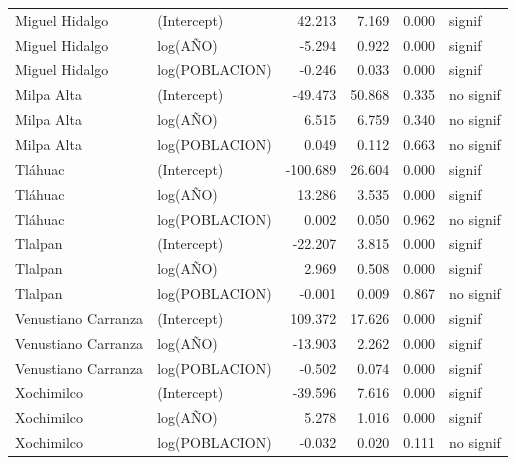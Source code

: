 \documentclass[
  spanish,
]{article}
\begin{document}
\begin{table}
\begin{tabular}[t]{llrrrl}
\addlinespace
Miguel Hidalgo & (Intercept) & 42.213 & 7.169 & 0.000 & signif\\
Miguel Hidalgo & log(AÑO) & -5.294 & 0.922 & 0.000 & signif\\
Miguel Hidalgo & log(POBLACION) & -0.246 & 0.033 & 0.000 & signif\\
\addlinespace
Milpa Alta & (Intercept) & -49.473 & 50.868 & 0.335 & no signif\\
Milpa Alta & log(AÑO) & 6.515 & 6.759 & 0.340 & no signif\\
Milpa Alta & log(POBLACION) & 0.049 & 0.112 & 0.663 & no signif\\
\addlinespace
Tláhuac & (Intercept) & -100.689 & 26.604 & 0.000 & signif\\
Tláhuac & log(AÑO) & 13.286 & 3.535 & 0.000 & signif\\
Tláhuac & log(POBLACION) & 0.002 & 0.050 & 0.962 & no signif\\
\addlinespace
Tlalpan & (Intercept) & -22.207 & 3.815 & 0.000 & signif\\
Tlalpan & log(AÑO) & 2.969 & 0.508 & 0.000 & signif\\
Tlalpan & log(POBLACION) & -0.001 & 0.009 & 0.867 & no signif\\
\addlinespace
Venustiano Carranza & (Intercept) & 109.372 & 17.626 & 0.000 & signif\\
Venustiano Carranza & log(AÑO) & -13.903 & 2.262 & 0.000 & signif\\
Venustiano Carranza & log(POBLACION) & -0.502 & 0.074 & 0.000 & signif\\
\addlinespace
Xochimilco & (Intercept) & -39.596 & 7.616 & 0.000 & signif\\
Xochimilco & log(AÑO) & 5.278 & 1.016 & 0.000 & signif\\
Xochimilco & log(POBLACION) & -0.032 & 0.020 & 0.111 & no signif\\
\bottomrule
\end{tabular}
\end{table}
\end{document}
